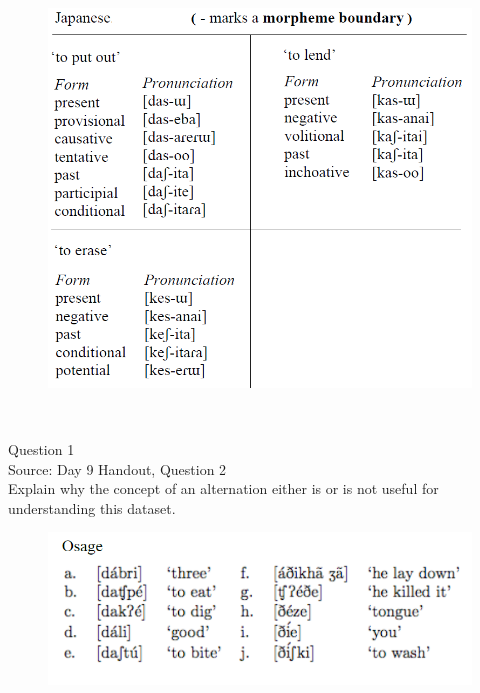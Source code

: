 \documentclass[12pt]{article}
\begin{document}
\begin{figure}[H]
\includegraphics{../images/japanese_verbs.png}
\end{figure}

\newpage

\begin{center}
\textbf{{\color{red}{\HUGE END OF EXAM}}}\\

\end{center}
\newpage

\begin{center}
\textbf{{\color{blue}{\HUGE START OF EXAM\\}}}

\textbf{{\color{blue}{\HUGE Student ID: 3288\\}}}

\textbf{{\color{blue}{\HUGE 10:50 - 11:10 AM\\}}}

\end{center}
\newpage

{\large Question 1}\\

Source: Day 9 Handout, Question 2\\

Explain why the concept of an alternation either is or is not useful for understanding this dataset.\\

\begin{figure}[H]
\includegraphics{../images/osage.png}
\end{figure}
\end{document}
